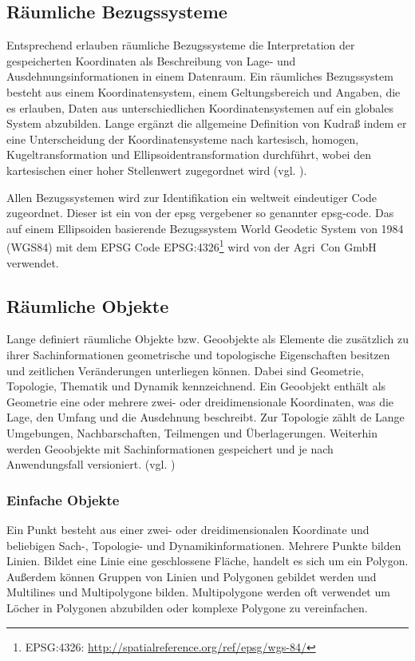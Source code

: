 \subsection{Räumliche Bezugssysteme}
Entsprechend \cite[S.506]{book:kudrass} erlauben räumliche Bezugssysteme die Interpretation der gespeicherten Koordinaten als Beschreibung von Lage- und Ausdehnungsinformationen in einem Datenraum. Ein räumliches Bezugssystem besteht aus einem Koordinatensystem, einem Geltungsbereich und Angaben, die es erlauben, Daten aus unterschiedlichen Koordinatensystemen auf ein globales System abzubilden.
Lange ergänzt die allgemeine Definition von Kudraß indem er eine Unterscheidung der Koordinatensysteme nach kartesisch, homogen, Kugeltransformation und Ellipsoidentransformation durchführt, wobei den kartesischen einer hoher Stellenwert zugegordnet wird (vgl. \cite[S.141 ff.]{book:gi-theopluspraxis3}).

Allen Bezugssystemen wird zur Identifikation ein weltweit eindeutiger Code zugeordnet.
Dieser ist ein von der \Gls{epsg} vergebener so genannter \Gls{epsg-code}.
Das auf einem Ellipsoiden basierende Bezugssystem World Geodetic System von 1984 (WGS84) mit dem EPSG Code EPSG:4326\footnote{EPSG:4326: \url{http://spatialreference.org/ref/epsg/wgs-84/}} wird von der Agri~Con GmbH verwendet.


\subsection{Räumliche Objekte}
Lange definiert räumliche Objekte bzw. Geoobjekte als Elemente die zusätzlich zu ihrer Sachinformationen geometrische und topologische Eigenschaften besitzen und zeitlichen Veränderungen unterliegen können. Dabei sind Geometrie, Topologie, Thematik und Dynamik kennzeichnend.
Ein Geoobjekt enthält als Geometrie eine oder mehrere zwei- oder dreidimensionale Koordinaten, was die Lage, den Umfang und die Ausdehnung beschreibt.
Zur Topologie zählt de Lange Umgebungen, Nachbarschaften, Teilmengen und Überlagerungen.
Weiterhin werden Geoobjekte mit Sachinformationen gespeichert und je nach Anwendungsfall versioniert. (vgl. \cite[S.133]{book:gi-theopluspraxis3})


\subsubsection{Einfache Objekte}
Ein Punkt besteht aus einer zwei- oder dreidimensionalen Koordinate und beliebigen Sach-, Topologie- und Dynamikinformationen.
Mehrere Punkte bilden Linien.
Bildet eine Linie eine geschlossene Fläche, handelt es sich um ein Polygon.
Außerdem können Gruppen von Linien und Polygonen gebildet werden und Multilines und Multipolygone bilden.
Multipolygone werden oft verwendet um Löcher in Polygonen abzubilden oder komplexe Polygone zu vereinfachen.

